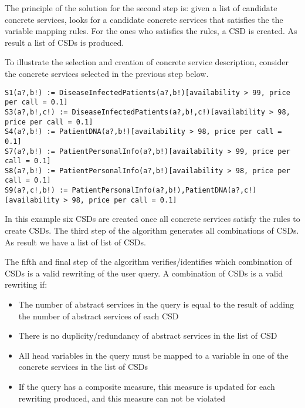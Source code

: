 \documentclass[12pt,a4paper,oneside]{article}
\begin{document}
The principle of the solution for the second step is: given a list of candidate concrete services, looks for a candidate concrete services that satisfies the the variable mapping rules. For the ones who satisfies the rules, a CSD is created. As result a list of CSDs is produced.

To illustrate the selection and creation of concrete service description, consider the concrete services selected in the previous step below.
\begin{tiny}
\begin{verbatim}
S1(a?,b!) := DiseaseInfectedPatients(a?,b!)[availability > 99, price per call = 0.1]
S3(a?,b!,c!) := DiseaseInfectedPatients(a?,b!,c!)[availability > 98, price per call = 0.1]
S4(a?,b!) := PatientDNA(a?,b!)[availability > 98, price per call = 0.1]
S7(a?,b!) := PatientPersonalInfo(a?,b!)[availability > 99, price per call = 0.1]
S8(a?,b!) := PatientPersonalInfo(a?,b!)[availability > 98, price per call = 0.1]
S9(a?,c!,b!) := PatientPersonalInfo(a?,b!),PatientDNA(a?,c!)[availability > 98, price per call = 0.1] 
\end{verbatim}
\end{tiny}

In this example six CSDs are created once all concrete services satisfy the rules to create CSDs. The third step of the algorithm generates all combinations of CSDs. As result we have a list of list of CSDs.

The fifth and final step of the algorithm verifies/identifies which combination of CSDs is a valid rewriting of the user query. A combination of CSDs is a valid rewriting if:
\begin{itemize}
\item The number of abstract services in the query is equal to the result of adding the number of abstract services of each CSD
\item There is no duplicity/redundancy of abstract services in the list of CSD
\item All head variables in the query must be mapped to a variable in one of the concrete services in the list of CSDs
\item If the query has a composite measure, this measure is updated for each rewriting produced, and this measure can not be violated
\end{itemize}
\end{document}
